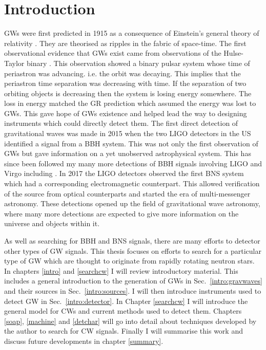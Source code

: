 \chapter{\label{intro}Introduction}


\Glspl{GW} were first predicted in 1915 as a consequence of Einstein's general theory of relativity \citep{einstein2005GrundlageAllgemeinen}.
They are theorised as ripples in the fabric of space-time.
The first observational evidence that \glspl{GW} exist came from observations of the Hulse-Taylor binary \citep{weisberg1981GravitationalWaves,weisberg2004RelativisticBinary}. 
This observation showed a binary pulsar system whose time of periastron was advancing. i.e. the orbit was decaying. 
This implies that the periastron time separation was decreasing with time. 
If the separation of two orbiting objects is decreasing then the system is losing energy somewhere.
The loss in energy matched the \gls{GR} prediction which assumed the energy was lost to \glspl{GW}.
This gave hope of \glspl{GW} existence and helped lead the way to designing instruments which could directly detect them.
The first direct detection of gravitational waves was made in 2015 when the two \gls{LIGO} detectors in the US \citep{abbott2016ObservationGravitational} identified a signal from a \gls{BBH} system.
This was not only the first observation of \glspl{GW} but gave information on a yet unobserved astrophysical system.
This has since been followed my many more detections of \gls{BBH} signals involving \gls{LIGO} and Virgo including \citep{abbott2017GW170814ThreeDetector,theligoscientificcollaboration2020GW190425Observation}.
In 2017 the \gls{LIGO} detectors observed the first \gls{BNS} system \citep{abbott2017GW170817Observation} which had a corresponding electromagnetic counterpart.
This allowed verification of the source from optical counterparts and started the era of multi-messenger astronomy.
These detections opened up the field of gravitational wave astronomy, where many more detections are expected to give more information on the universe and objects within it.

As well as searching for \gls{BBH} and \gls{BNS} signals, there are many efforts to detector other types of \gls{GW} signals. 
This thesis focuses on efforts to search for a particular type of \gls{GW} which are thought to originate from rapidly rotating neutron stars.
In chapters \ref{intro} and \ref{searchcw} I will review introductory material. 
This includes a general introduction to the generation of \glspl{GW} in Sec.~\ref{intro:gravwaves} and their sources in Sec.~\ref{intro:sources}.
I will then introduce instruments used to detect \gls{GW} in Sec.~\ref{intro:detector}.
In Chapter \ref{searchcw} I will introduce the general model for \glspl{CW} and current methods used to detect them.
Chapters \ref{soap}, \ref{machine} and \ref{detchar} will go into detail about techniques developed by the author to search for \gls{CW} signals. 
Finally I will summarise this work and discuss future developments in chapter \ref{summary}.


